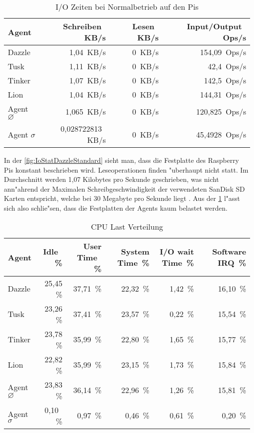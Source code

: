 \begin{table}
\centering
\begin{tabular}{l%
 r<{\,KB/s}%
 r<{\,KB/s}%
 r<{\,Ops/s}%
}
Agent	  			& Schreiben	 	& Lesen			& Input/Output 		\\	
\hline
Dazzle 				& 1,04			& 0			& 154,09	        \\
Tusk 				& 1,11			& 0			& 42,4			\\
Tinker				& 1,07 			& 0			& 142,5		 	\\
Lion				& 1,04			& 0			& 144,31	 	\\
Agent $\diameter $  		& 1,065			& 0			& 120,825		\\   
Agent $\sigma $ 		& 0,028722813  		& 0			& 45,4928		\\
\end{tabular}
\caption{I/O Zeiten bei Normalbetrieb auf den Pis}
\label{tab:NormalbetriebIoStat20Mb}
\end{table}


In der \cref{fig:IoStatDazzleStandard} sieht man, dass die Festplatte des Raspberry Pis konstant beschrieben wird. %
Leseoperationen finden "uberhaupt nicht statt. %
Im Durchschnitt werden 1,07 Kilobytes pro Sekunde geschrieben, %
was nicht ann"ahrend der Maximalen Schreibgeschwindigkeit der verwendeten %
SanDisk SD Karten entspricht, welche bei 30 Megabyte pro Sekunde liegt \autocite{san:sd}. %
Aus der \cref{tab:NormalbetriebIoStat20Mb} l"asst sich also schlie"sen, dass die Festplatten der Agents kaum belastet werden. %

\begin{table}
\centering
\begin{tabular}{l%
 r<{\,\%}%
 r<{\,\%}%
 r<{\,\%}%
 r<{\,\%}%
 r<{\,\%}%
}
Agent  				& Idle			& User Time		& System Time		& I/O wait Time	& Software IRQ	\\
\hline
Dazzle 				& 25,45			& 37,71			& 22,32 		& 1,42		& 16,10	\\
Tusk 				& 23,26			& 37,41			& 23,57			& 0,22		& 15,54	\\
Tinker				& 23,78			& 35,99			& 22,80			& 1,65		& 15,77	\\
Lion				& 22,82			& 35,99			& 23,15			& 1,73		& 15,84	\\ 
Agent $\diameter $  		& 23,83			& 36,14			& 22,96			& 1,26	 	& 15,81	\\   
Agent $\sigma $			&  0,10			&  0,97			&  0,46			& 0,61		& 0,20  \\ %
%
\end{tabular}
\caption{CPU Last Verteilung}
\label{tab:CPUlastverteilung20Mb}
\end{table}

